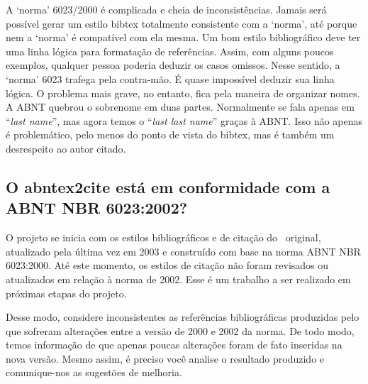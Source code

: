 \documentclass[a4paper]{ltxdoc}
\begin{document}
A `norma' 6023/2000\cite{NBR6023:2000} é complicada e cheia de inconsistências.
Jamais será possível gerar um estilo \textsf{bibtex} totalmente consistente com
a `norma', até porque nem a `norma' é compatível com ela mesma. Um bom estilo bibliográfico
deve ter uma linha lógica para formatação de referências. Assim, com alguns
poucos exemplos, qualquer pessoa poderia deduzir os casos omissos. Nesse
sentido, a `norma' 6023 trafega pela contra-mão. É quase impossível deduzir sua
linha lógica. O problema mais grave, no entanto, fica pela maneira de organizar
nomes. A ABNT quebrou o sobrenome em duas partes. Normalmente se fala apenas em
``\textit{last name}'', mas agora temos o ``\textit{last last name}'' graças à
ABNT. Isso não apenas é problemático, pelo menos do ponto de vista do
\textsf{bibtex}, mas é também um desrespeito ao autor citado.


\subsection{O \textsf{abntex2cite} está em conformidade com a ABNT NBR
6023:2002?}

O projeto  se inicia com os estilos bibliográficos e de citação do
\abnTeX\ original, atualizado pela última vez em 2003 e construído com base na
norma ABNT NBR 6023:2000. Até este momento, os estilos de citação não foram
revisados ou atualizados em relação à norma de 2002. Esse é um trabalho a ser
realizado em próximas etapas do projeto.

Desse modo, considere inconsistentes as referências bibliográficas produzidas
pelo  que sofreram alterações entre a versão de 2000 e 2002 da norma. De
todo modo, temos informação de que apenas poucas alterações foram de fato
inseridas na nova versão. Mesmo assim, é preciso você analise o resultado
produzido e comunique-nos as sugestões de melhoria.
\end{document}
